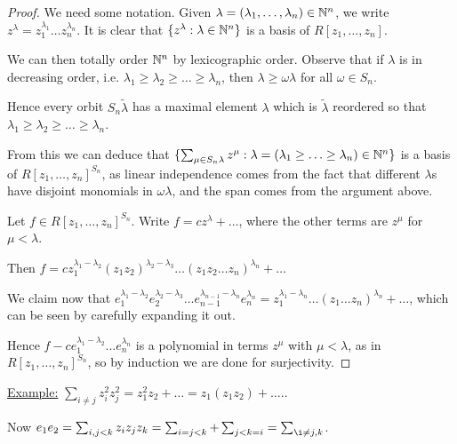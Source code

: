 \documentclass[10pt,a4paper]{article}
\begin{document}
\begin{proof}
We need some notation. Given $\lambda = (\lambda_1, \ldots, \lambda_n) \in \mathbb{N}^n$, we write $z^{\lambda} = z_1^{\lambda_1}\ldots z_n^{\lambda_n}$. It is clear that $\{z^{\lambda} : \lambda \in \mathbb{N}^n\}$ is a basis of $R[z_1, \ldots, z_n]$.

We can then totally order $\mathbb{N}^n$ by lexicographic order. Observe that if $\lambda$ is in decreasing order, i.e. $\lambda_1 \geq \lambda_2 \geq \ldots \geq \lambda_n$, then $\lambda \geq \omega \lambda$ for all $\omega \in S_n$.

Hence every orbit $S_n \tilde{\lambda}$ has a maximal element $\lambda$ which is $\tilde{\lambda}$ reordered so that $\lambda_1 \geq \lambda_2 \geq \ldots \geq \lambda_n$.

From this we can deduce that $\{\sum_{\mu \in S_n \lambda} z^{\mu} : \lambda = (\lambda_1 \geq \ldots \geq \lambda_n) \in \mathbb{N}^n\}$ is a basis of $R[z_1, \ldots, z_n]^{S_n}$, as linear independence comes from the fact that different $\lambda$s have disjoint monomials in $\omega\lambda$, and the span comes from the argument above.

Let $f \in R[z_1, \ldots, z_n]^{S_n}$. Write $f = cz^{\lambda} + \ldots$, where the other terms are $z^{\mu}$ for $\mu < \lambda$.

Then $f = cz_1^{\lambda_1-\lambda_2}(z_1z_2)^{\lambda_2-\lambda_3}\ldots(z_1z_2 \ldots z_n)^{\lambda_n} + \ldots$

We claim now that $e_1^{\lambda_1-\lambda_2}e_2^{\lambda_2-\lambda_3}\ldots e_{n-1}^{\lambda_{n-1}-\lambda_n} e_n^{\lambda_n} = z_1^{\lambda_1-\lambda_n}\ldots (z_1\ldots z_n)^{\lambda_n} + \ldots$, which can be seen by carefully expanding it out.

Hence $f-ce_1^{\lambda_1 - \lambda_2}\ldots e_n^{\lambda_n}$ is a polynomial in terms $z^{\mu}$ with $\mu < \lambda$, as in $R[z_1, \ldots, z_n]^{S_n}$, so by induction we are done for surjectivity.
\end{proof}

\underline{Example:} $\sum_{i\neq j} z_i^2 z_j^2 = z_1^2 z_2 + \ldots = z_1(z_1z_2) + \ldots.$.

Now $e_1e_2 = \sum_{i, j<k} z_iz_jz_k = \sum_{i=j<k} +\sum_{j<k=i} = \sum_{\i\neq j, k}$.
\end{document}
